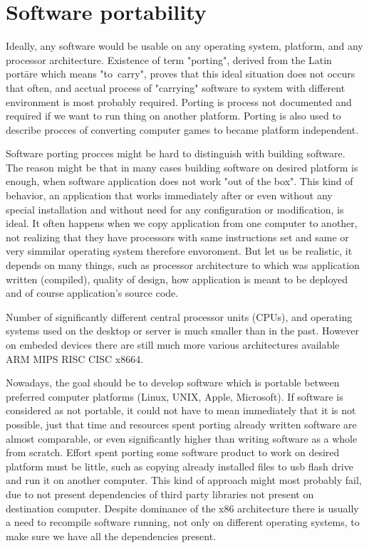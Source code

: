 \chapter{Software portability}\label{porting}

Ideally, any software would be usable on any operating system, platform, and any processor architecture.
Existence of term "porting", derived from the Latin portāre which means "to~carry", proves that this ideal situation does not occurs that often, and acctual process of "carrying" software to system with different environment is most probably required.
Porting is process not documented and required if we want to run thing on another platform.
Porting is also used to describe procces of converting computer games to became platform independent.

Software porting procces might be hard to distinguish with building software.
The reason might be that in many cases building software on desired platform is enough, when software application does not work "out of the box".
This kind of behavior, an application that works immediately after or even without any special installation and without need for any configuration or modification, is ideal.
It often happens when we copy application from one computer to another, not realizing that they have processors with same instructions set and same or very simmilar operating system therefore envoroment.
But let us be realistic, it depends on many things, such as processor architecture to which was application written (compiled), quality of design, how application is meant to be deployed and of course application's source code.

Number of significantly different central processor units (CPUs), and operating systems used on the desktop or server is much smaller than in the past.
However on embeded devices there are still much more various architectures available ARM MIPS  RISC CISC x8664. 

Nowadays, the goal should be to develop software which is portable between preferred computer platforms (Linux, UNIX, Apple, Microsoft).
If software is considered as not portable, it could not have to mean immediately that it is not possible, just that time and resources spent porting already written software are almost comparable, or even significantly higher than writing software as a whole from scratch.
Effort spent porting some software product to work on desired platform must be little, such as copying already installed files to usb flash drive and run it on another computer.
This kind of approach might most probably fail, due to not present dependencies of third party libraries not present on destination computer.
Despite dominance of the x86 architecture there is usually a need to recompile software running, not only on different operating systems, to make sure we have all the dependencies present.

